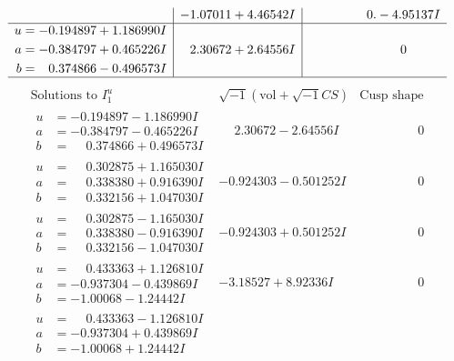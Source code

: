 \documentclass[1p]{elsarticle_modified}
\theoremstyle{definition}
\newcommand{\I}{\sqrt{-1}}
\begin{document}
$$\begin{array}{c|c|c}
 & -1.07011 + 4.46542 I & \phantom{-0.000000 } 0. - 4.95137 I \\ \hline\begin{aligned}
u &= -0.194897 + 1.186990 I \\
a &= -0.384797 + 0.465226 I \\
b &= \phantom{-}0.374866 - 0.496573 I\end{aligned}
 & \phantom{-}2.30672 + 2.64556 I & \phantom{-0.000000 } 0\\
 \hline 
 \end{array}$$\newpage$$\begin{array}{c|c|c}  
\text{Solutions to }I^u_{1}& \I (\text{vol} + \sqrt{-1}CS) & \text{Cusp shape}\\
 \hline 
\begin{aligned}
u &= -0.194897 - 1.186990 I \\
a &= -0.384797 - 0.465226 I \\
b &= \phantom{-}0.374866 + 0.496573 I\end{aligned}
 & \phantom{-}2.30672 - 2.64556 I & \phantom{-0.000000 } 0 \\ \hline\begin{aligned}
u &= \phantom{-}0.302875 + 1.165030 I \\
a &= \phantom{-}0.338380 + 0.916390 I \\
b &= \phantom{-}0.332156 + 1.047030 I\end{aligned}
 & -0.924303 - 0.501252 I & \phantom{-0.000000 } 0 \\ \hline\begin{aligned}
u &= \phantom{-}0.302875 - 1.165030 I \\
a &= \phantom{-}0.338380 - 0.916390 I \\
b &= \phantom{-}0.332156 - 1.047030 I\end{aligned}
 & -0.924303 + 0.501252 I & \phantom{-0.000000 } 0 \\ \hline\begin{aligned}
u &= \phantom{-}0.433363 + 1.126810 I \\
a &= -0.937304 - 0.439869 I \\
b &= -1.00068 - 1.24442 I\end{aligned}
 & -3.18527 + 8.92336 I & \phantom{-0.000000 } 0 \\ \hline\begin{aligned}
u &= \phantom{-}0.433363 - 1.126810 I \\
a &= -0.937304 + 0.439869 I \\
b &= -1.00068 + 1.24442 I\end{aligned}

\end{array}$$
\end{document}
